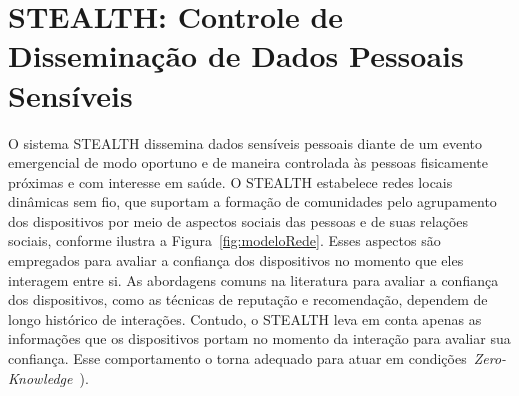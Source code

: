 \documentclass[12pt]{article}
\newcommand{\as}[1]{\textcolor{blue}{{\bf #1}}}
\begin{document}

\section{STEALTH: Controle de Disseminação de Dados Pessoais Sensíveis}
\label{sec:sistema}

O sistema \mbox{STEALTH} dissemina dados sensíveis pessoais diante de um evento emergencial de modo oportuno e de maneira controlada às pessoas fisicamente próximas e com interesse em saúde. 
O \mbox{STEALTH}
estabelece redes locais dinâmicas sem fio, que suportam a formação de comunidades pelo agrupamento dos dispositivos por meio de aspectos sociais das pessoas e de suas relações sociais,
conforme
ilustra a Figura~\ref{fig:modeloRede}. Esses aspectos são empregados para avaliar a confiança dos dispositivos no momento que eles interagem entre si. As abordagens 
comuns na literatura para avaliar a confiança dos dispositivos, como as técnicas de reputação e recomendação, dependem de longo histórico de interações. 
Contudo,
o \mbox{STEALTH} leva em conta
apenas
as informações que os dispositivos
portam
no momento da interação para avaliar sua confiança. Esse comportamento o torna adequado para atuar em condições~\textit{Zero-Knowledge}~\cite{kim2015hcs}).
\end{document}
